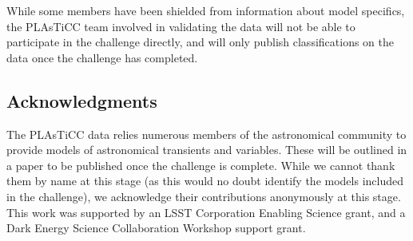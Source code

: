 \documentclass[\docopts]{\docclass}
\begin{document}
While some members have been shielded from information about model specifics, the PLAsTiCC team involved in validating the data will not be able to participate in the challenge directly, and will only publish classifications on the data once the challenge has completed.


\subsection{Acknowledgments}
The PLAsTiCC data relies numerous members of the astronomical community to provide models of astronomical transients and variables. These will be outlined in a paper to be published once the challenge is complete. While we cannot thank them by name at this stage (as this would no doubt identify the models included in the challenge), we acknowledge their contributions anonymously at this stage. This work was supported by an LSST Corporation Enabling Science grant, and a Dark Energy Science Collaboration Workshop support grant.










%
\end{document}
